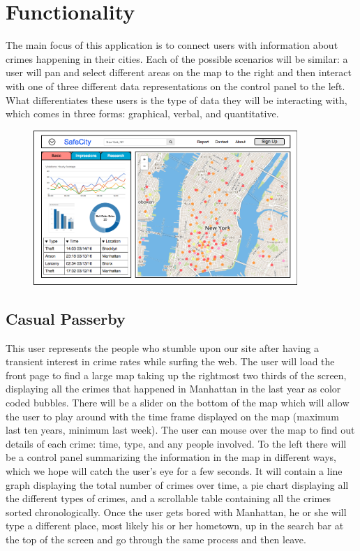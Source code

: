 \documentclass[paper=a4, fontsize=11pt]{scrartcl} %
\numberwithin{equation}{section} %
\numberwithin{figure}{section} %
\numberwithin{table}{section} %
\begin{document}

\section{Functionality}

The main focus of this application is to connect users with information about crimes happening in their cities. Each of the possible scenarios will be similar: a user will pan and select different areas on the map to the right and then interact with one of three different data representations on the control panel to the left. What differentiates these users is the type of data they will be interacting with, which comes in three forms: graphical, verbal, and quantitative.  \\

\begin{figure}[h]
\includegraphics[width=10cm]{mockup}
\centering
\end{figure}


\subsection{Casual Passerby}

This user represents the people who stumble upon our site after having a transient interest in crime rates while surfing the web. The user will load the front page to find a large map taking up the rightmost two thirds of the screen, displaying all the crimes that happened in Manhattan in the last year as color coded bubbles. There will be a slider on the bottom of the map which will allow the user to play around with the time frame displayed on the map (maximum last ten years, minimum last week). The user can mouse over the map to find out details of each crime: time, type, and any people involved. To the left there will be a control panel summarizing the information in the map in different ways, which we hope will catch the user's eye for a few seconds. It will contain a line graph displaying the total number of crimes over time, a pie chart displaying all the different types of crimes, and a scrollable table containing all the crimes sorted chronologically. Once the user gets bored with Manhattan, he or she will type a different place, most likely his or her hometown, up in the search bar at the top of the screen and go through the same process and then leave.
\end{document}
